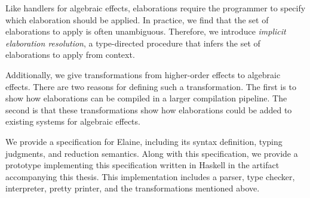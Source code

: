 Like handlers for algebraic effects, elaborations require the programmer to specify which elaboration should be applied. In practice, we find that the set of elaborations to apply is often unambiguous. Therefore, we introduce \emph{implicit elaboration resolution}, a type-directed procedure that infers the set of elaborations to apply from context.

Additionally, we give transformations from higher-order effects to algebraic effects. There are two reasons for defining such a transformation. The first is to show how elaborations can be compiled in a larger compilation pipeline. The second is that these transformations show how elaborations could be added to existing systems for algebraic effects.

We provide a specification for Elaine, including its syntax definition, typing judgments, and reduction semantics. Along with this specification, we provide a prototype implementing this specification written in Haskell in the artifact accompanying this thesis. This implementation includes a parser, type checker, interpreter, pretty printer, and the transformations mentioned above.

